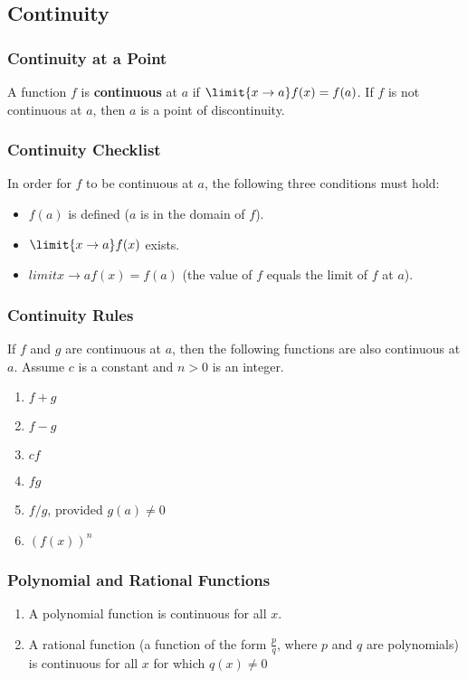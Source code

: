 %
%
%

\subsection{Continuity}
\subsubsection{Continuity at a Point}
A function $f$ is \textbf{continuous} at $a$ if $\limit{x \rightarrow a} f(x) = f(a)$. If $f$ is not continuous at $a$, then $a$ is a point of discontinuity.

\subsubsection{Continuity Checklist}
In order for $f$ to be continuous at $a$, the following three conditions must hold:

\begin{itemize}
    \item $f(a)$ is defined ($a$ is in the domain of $f$).
    \item $\limit{x \rightarrow a} f(x)$ exists.
    \item $limit{x \rightarrow a} f(x) = f(a)$ (the value of $f$ equals the limit of $f$ at $a$).
\end{itemize}

\subsubsection{Continuity Rules}
If $f$ and $g$ are continuous at $a$, then the following functions are also continuous at $a$. Assume $c$ is a constant and $n > 0$ is an integer.

\begin{enumerate}
    \item $f + g$
    \item $f - g$
    \item $cf$
    \item $fg$
    \item $f / g$, provided $g(a) \neq 0$
    \item ${(f(x))}^n$
\end{enumerate}

\subsubsection{Polynomial and Rational Functions}
\begin{enumerate}
    \item A polynomial function is continuous for all $x$.
    \item A rational function (a function of the form $\frac{p}{q}$, where $p$ and $q$ are polynomials) is continuous for all $x$ for which $q(x) \neq 0$
\end{enumerate}

